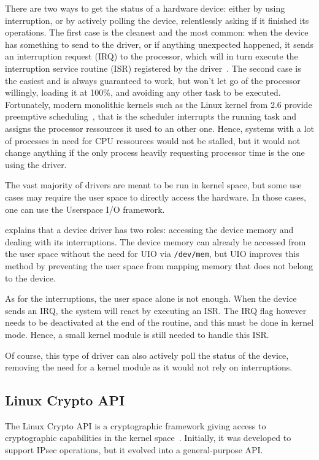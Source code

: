 There are two ways to get the status of a hardware device: either by using interruption, or by actively polling the device, relentlessly asking if it finished its operations.
The first case is the cleanest and the most common: when the device has something to send to the driver, or if anything unexpected happened, it sends an interruption request (IRQ) to the processor, which will in turn execute the interruption service routine (ISR) registered by the driver~\citep[chap. 10]{Corbet:2005:LDD:1209083}.
The second case is the easiest and is always guaranteed to work, but won't let go of the processor willingly, loading it at 100\%, and avoiding any other task to be executed.
Fortunately, modern monolithic kernels such as the Linux kernel from 2.6 provide preemptive scheduling~\cite{Santhanam2003}, that is the scheduler interrupts the running task and assigns the processor ressources it used to an other one.
Hence, systems with a lot of processes in need for CPU ressources would not be stalled, but it would not change anything if the only process heavily requesting processor time is the one using the driver.\newline{}

The vast majority of drivers are meant to be run in kernel space, but some use cases may require the user space to directly access the hardware.
In those cases, one can use the Userspace I/O framework.

\citet{koch2011} explains that a device driver has two roles: accessing the device memory and dealing with its interruptions.
The device memory can already be accessed from the user space without the need for UIO via \texttt{/dev/mem}, but UIO improves this method by preventing the user space from mapping memory that does not belong to the device.

\noindent As for the interruptions, the user space alone is not enough.
When the device sends an IRQ, the system will react by executing an ISR.
The IRQ flag however needs to be deactivated at the end of the routine, and this must be done in kernel mode.
Hence, a small kernel module is still needed to handle this ISR.

\noindent Of course, this type of driver can also actively poll the status of the device, removing the need for a kernel module as it would not rely on interruptions.


\subsection{Linux Crypto API}
The Linux Crypto API is a cryptographic framework giving access to cryptographic capabilities in the kernel space~\cite{morris2003}.
Initially, it was developed to support IPsec operations, but it evolved into a general-purpose API.

